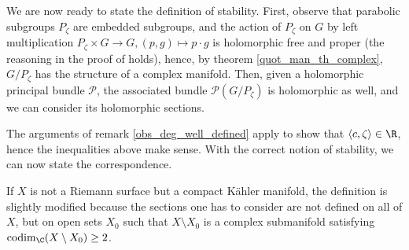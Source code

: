 We are now ready to state the definition of stability. First, observe that parabolic subgroups \(P_\zeta\) are embedded subgroups, and the action of \(P_\zeta\) on \(G\) by left multiplication \(P_\zeta \times G \to G, (p,g) \mapsto p\cdot g \) is holomorphic free and proper (the reasoning in the proof of \parencite[Th. 21.17]{lee_introSM} holds), hence, by theorem \ref{quot_man_th_complex}, \(G/P_\zeta\) has the structure of a complex manifold. Then, given a holomorphic principal bundle \(\mathcal{P}\), the associated bundle \(\mathcal{P}(G/P_\zeta)\) is holomorphic as well, and we can consider its holomorphic sections.


The arguments of remark \ref{obs_deg_well_defined} apply to show that \(\langle c, \zeta \rangle \in \R\), hence the inequalities above make sense. With the correct notion of stability, we can now state the correspondence.

\begin{obs}
    If \(X\) is not a Riemann surface but a compact Kähler manifold, the definition is slightly modified because the sections one has to consider are not defined on all of \(X\), but on open sets \(X_0\) such that \(X\setminus X_0\) is a complex submanifold satisfying \(\operatorname{codim}_\C( X\setminus X_0)\geq 2\). 
\end{obs}

